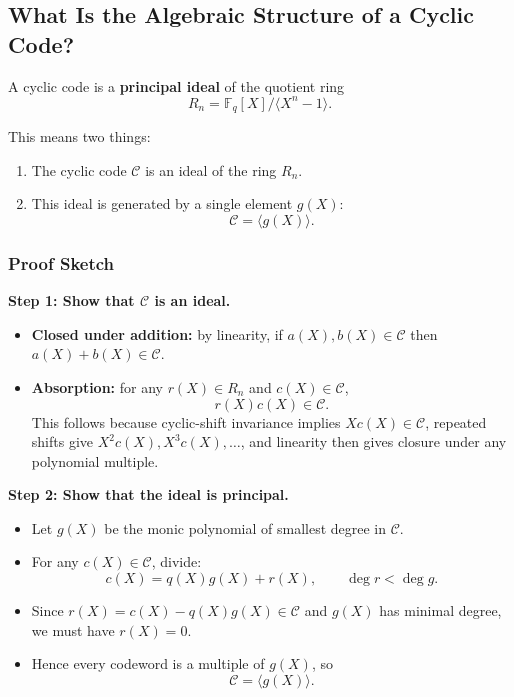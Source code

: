 \documentclass[
]{article}
\providecommand{\tightlist}{%
  \setlength{\itemsep}{0pt}\setlength{\parskip}{0pt}}
\begin{document}
\subsection{What Is the Algebraic Structure of a Cyclic
Code?}\label{what-is-the-algebraic-structure-of-a-cyclic-code}

A cyclic code is a \textbf{principal ideal} of the quotient ring
\[R_n = \mathbb{F}_q[X]/\langle X^n-1 \rangle.\]

This means two things:

\begin{enumerate}
\def\labelenumi{\arabic{enumi}.}
\tightlist
\item
  The cyclic code \(\mathcal{C}\) is an ideal of the ring \(R_n\).
\item
  This ideal is generated by a single element \(g(X)\):
  \[\mathcal{C}=\langle g(X) \rangle.\]
\end{enumerate}

\subsubsection{Proof Sketch}\label{proof-sketch}

\textbf{Step 1: Show that \(\mathcal{C}\) is an ideal.}

\begin{itemize}
\tightlist
\item
  \textbf{Closed under addition:} by linearity, if
  \(a(X),b(X)\in\mathcal{C}\) then \(a(X)+b(X)\in\mathcal{C}\).
\item
  \textbf{Absorption:} for any \(r(X)\in R_n\) and
  \(c(X)\in\mathcal{C}\), \[r(X)c(X)\in \mathcal{C}.\] This follows
  because cyclic-shift invariance implies \(Xc(X)\in\mathcal{C}\),
  repeated shifts give \(X^2c(X),X^3c(X),\dots\), and linearity then
  gives closure under any polynomial multiple.
\end{itemize}

\textbf{Step 2: Show that the ideal is principal.}

\begin{itemize}
\tightlist
\item
  Let \(g(X)\) be the monic polynomial of smallest degree in
  \(\mathcal{C}\).
\item
  For any \(c(X)\in\mathcal{C}\), divide:
  \[c(X)=q(X)g(X)+r(X), \qquad \deg r < \deg g.\]
\item
  Since \(r(X)=c(X)-q(X)g(X)\in\mathcal{C}\) and \(g(X)\) has minimal
  degree, we must have \(r(X)=0\).
\item
  Hence every codeword is a multiple of \(g(X)\), so
  \[\mathcal{C}=\langle g(X) \rangle.\]
\end{itemize}
\end{document}
